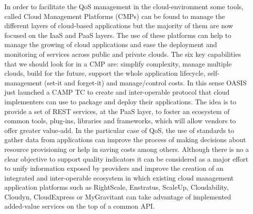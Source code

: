 In order to facilitate the QoS management in the cloud-environment some tools, called Cloud Management Platforms (CMPs) can be found 
to manage the different layers of cloud-based applications but the majority of them are now focused on the IaaS and PaaS layers. 
The use of these platforms can help to manage the growing of cloud applications and ease the deployment and monitoring of services across 
public and private clouds. The six key capabilities~\cite{Kephart2012} that we should look for in a CMP are: simplify complexity, 
manage multiple clouds, build for the future, support the whole application lifecycle, self-management (set-it and forget-it) and manage/control costs. 
In this sense OASIS just launched a CAMP TC to create and inter-operable protocol that cloud implementers can use to package and 
deploy their applications. The idea is to provide a set of REST services, at the PaaS layer, to foster an ecosystem of 
common tools, plug-ins, libraries and frameworks, which will allow vendors to offer greater value-add. 
In the particular case of QoS, the use of standards to gather data from applications can improve the process of making decisions 
about resource provisioning or help in saving costs among others. Although there is no a clear objective to support quality indicators 
it can be considered as a major effort to unify information exposed by providers and improve the creation of an integrated and inter-operable 
ecosystem in which existing cloud management application platforms such as RightScale, Enstratus, ScaleUp, Cloudability, Cloudyn, 
CloudExpress or MyGravitant can take advantage of implemented added-value services on the top of a common API. 




